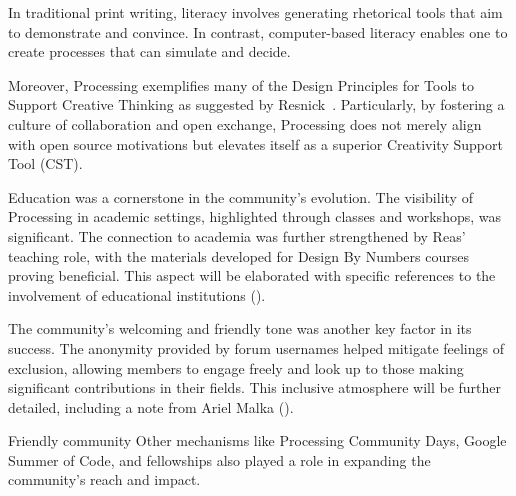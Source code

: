 In traditional print writing, literacy involves generating rhetorical tools that aim to demonstrate and convince. In contrast, computer-based literacy enables one to create processes that can simulate and decide. %

Moreover, Processing exemplifies many of the Design Principles for Tools to Support Creative Thinking as suggested by Resnick~\parencite{resnickDesignPrinciplesTools}. Particularly, by fostering a culture of collaboration and open exchange, Processing does not merely align with open source motivations but elevates itself as a superior Creativity Support Tool (CST). %



Education was a cornerstone in the community's evolution. The visibility of Processing in academic settings, highlighted through classes and workshops, was significant. The connection to academia was further strengthened by Reas' teaching role, with the materials developed for Design By Numbers courses proving beneficial. This aspect will be elaborated with specific references to the involvement of educational institutions ().

The community's welcoming and friendly tone was another key factor in its success. The anonymity provided by forum usernames helped mitigate feelings of exclusion, allowing members to engage freely and look up to those making significant contributions in their fields. This inclusive atmosphere will be further detailed, including a note from Ariel Malka ().

Friendly community
Other mechanisms like Processing Community Days, Google Summer of Code, and fellowships also played a role in expanding the community's reach and impact.


